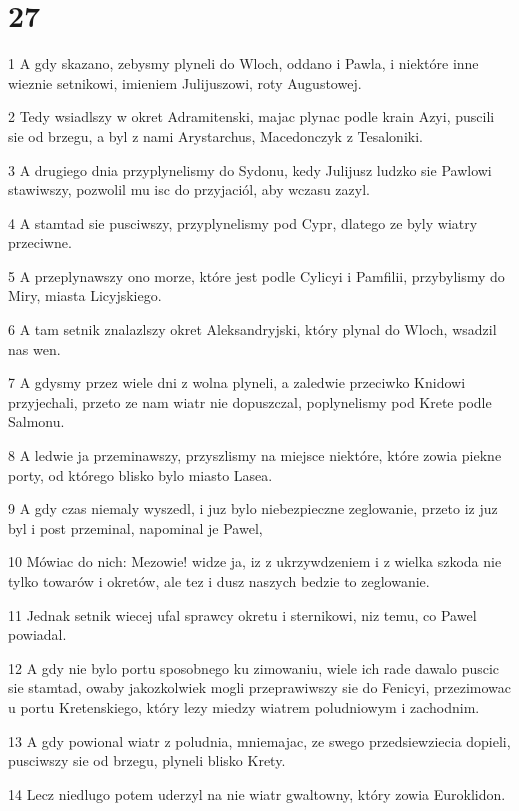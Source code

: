 \chapter{27}

\par 1 A gdy skazano, zebysmy plyneli do Wloch, oddano i Pawla, i niektóre inne wieznie setnikowi, imieniem Julijuszowi, roty Augustowej.
\par 2 Tedy wsiadlszy w okret Adramitenski, majac plynac podle krain Azyi, puscili sie od brzegu, a byl z nami Arystarchus, Macedonczyk z Tesaloniki.
\par 3 A drugiego dnia przyplynelismy do Sydonu, kedy Julijusz ludzko sie Pawlowi stawiwszy, pozwolil mu isc do przyjaciól, aby wczasu zazyl.
\par 4 A stamtad sie pusciwszy, przyplynelismy pod Cypr, dlatego ze byly wiatry przeciwne.
\par 5 A przeplynawszy ono morze, które jest podle Cylicyi i Pamfilii, przybylismy do Miry, miasta Licyjskiego.
\par 6 A tam setnik znalazlszy okret Aleksandryjski, który plynal do Wloch, wsadzil nas wen.
\par 7 A gdysmy przez wiele dni z wolna plyneli, a zaledwie przeciwko Knidowi przyjechali, przeto ze nam wiatr nie dopuszczal, poplynelismy pod Krete podle Salmonu.
\par 8 A ledwie ja przeminawszy, przyszlismy na miejsce niektóre, które zowia piekne porty, od którego blisko bylo miasto Lasea.
\par 9 A gdy czas niemaly wyszedl, i juz bylo niebezpieczne zeglowanie, przeto iz juz byl i post przeminal, napominal je Pawel,
\par 10 Mówiac do nich: Mezowie! widze ja, iz z ukrzywdzeniem i z wielka szkoda nie tylko towarów i okretów, ale tez i dusz naszych bedzie to zeglowanie.
\par 11 Jednak setnik wiecej ufal sprawcy okretu i sternikowi, niz temu, co Pawel powiadal.
\par 12 A gdy nie bylo portu sposobnego ku zimowaniu, wiele ich rade dawalo puscic sie stamtad, owaby jakozkolwiek mogli przeprawiwszy sie do Fenicyi, przezimowac u portu Kretenskiego, który lezy miedzy wiatrem poludniowym i zachodnim.
\par 13 A gdy powional wiatr z poludnia, mniemajac, ze swego przedsiewziecia dopieli, pusciwszy sie od brzegu, plyneli blisko Krety.
\par 14 Lecz niedlugo potem uderzyl na nie wiatr gwaltowny, który zowia Euroklidon.
